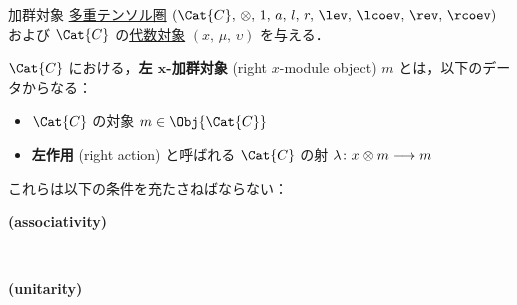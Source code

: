\documentclass[TQFT_main]{subfiles}
\begin{document}
\begin{mydef}[label=def:moduleobj,breakable]{加群対象}
    \hyperref[def:tensorfusion-cat]{多重テンソル圏} $(\Cat{C},\, \otimes,\, 1,\, a,\, l,\, r,\, \lev,\, \lcoev,\, \rev,\, \rcoev)$ 
    および $\Cat{C}$ の\hyperref[def:algobj]{代数対象} $(x,\, \mu,\, \upsilon)$ を与える．
    
    $\Cat{C}$ における，\textbf{左 $\bm{x}$-加群対象} (right $x$-module object) $m$ とは，以下のデータからなる：
    \begin{itemize}
        \item $\Cat{C}$ の対象 $m \in \Obj{\Cat{C}}$ 
        \item \textbf{左作用} (right action) と呼ばれる $\Cat{C}$ の射 $\lambda \colon x \otimes m \longrightarrow m$
    \end{itemize}
    これらは以下の条件を充たさねばならない：
    \begin{description}
        \item[\textbf{(associativity)}]　 
        
        \begin{center}
        \end{center}

        \item[\textbf{(unitarity)}]　 
        \begin{center}
        \end{center}
        
    \end{description}
    

\end{mydef}
\end{document}

